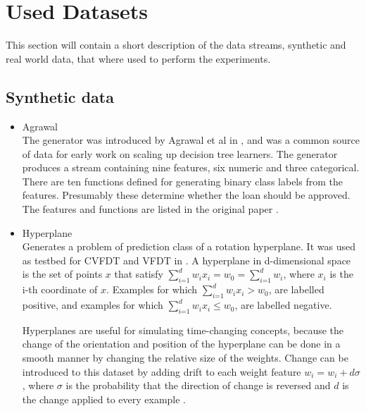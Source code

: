 \documentclass[12pt,oneside,a4paper,parskip]{scrbook}
\begin{document}
\section{Used Datasets}

This section will contain a short description of the data streams, synthetic and real world data, that where used to 
perform the experiments.

\subsection{Synthetic data}

\begin{itemize}
  \item Agrawal\\
        The generator was introduced by Agrawal et al in \cite{agrawal1993database}, and was a common source of data for early work on scaling up 
        decision tree learners. The generator produces a stream containing nine features, six numeric and three categorical. 
        There are ten functions defined for generating binary class labels from the features. Presumably these determine 
        whether the loan should be approved. The features and functions are listed in the original paper \cite{agrawal1993database,skmultiflow}.

  \item Hyperplane\\
        Generates a problem of prediction class of a rotation hyperplane. It was used as testbed for CVFDT and VFDT in \cite{hyperplane}.
        A hyperplane in d-dimensional space is the set of points $x$ that satisfy $\sum^d_\textit{i=1} w_ix_i=w_0 = \sum^d_\textit{i=1} w_i$,
        where $x_i$ is the i-th coordinate of $x$.  Examples for which $\sum^d_\textit{i=1} w_ix_i>w_0$, are 
        labelled positive, and examples for which $\sum^d_\textit{i=1}w_ix_i\leq w_0$, are labelled negative.

        Hyperplanes are useful for simulating time-changing concepts, because the change of the orientation and position
        of the hyperplane can be done in a smooth manner by changing the relative size of the weights.
        Change can be introduced to this dataset by adding drift to each weight feature $w_i=w_i + d\sigma$, where $\sigma$ is the 
        probability that the direction of change is reversed and $d$ is the change applied to every example \cite{skmultiflow}.


\end{itemize}
\end{document}
